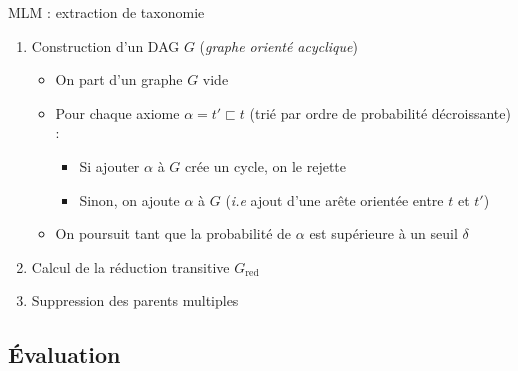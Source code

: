 \documentclass{beamer}
\begin{document}
\begin{frame}{MLM : extraction de taxonomie}
\begin{enumerate}
    \item Construction d'un DAG $G$ (\textit{graphe orienté acyclique})

\begin{itemize}
    \item On part d'un graphe $G$ vide
    \item Pour chaque axiome $\alpha = t' \sqsubset t$ (trié par ordre de probabilité décroissante) :
    \begin{itemize}
        \item Si ajouter $\alpha$ à $G$ crée un cycle, on le rejette
        \item Sinon, on ajoute $\alpha$ à $G$ (\textit{i.e} ajout d'une arête orientée entre $t$ et $t'$)
    \end{itemize}
    \item On poursuit tant que la probabilité de $\alpha$ est supérieure à un seuil $\delta$
\end{itemize}
    \item Calcul de la réduction transitive $G_\text{red}$
    \item Suppression des parents multiples
\end{enumerate}
    \begin{figure}
        
    \end{figure}
\end{frame}

\subsection{Évaluation}
\end{document}

